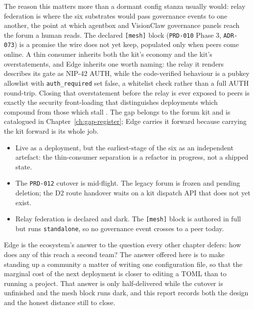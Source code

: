 The reason this matters more than a dormant config stanza usually would: relay federation is where the six substrates would pass governance events to one another, the point at which agentbox and VisionClaw governance panels reach the forum a human reads. The declared \texttt{[mesh]} block (\texttt{PRD-010} Phase 3, \texttt{ADR-073}) is a promise the wire does not yet keep, populated only when peers come online. A thin consumer inherits both the kit's economy and the kit's overstatements, and Edge inherits one worth naming: the relay it renders describes its gate as NIP-42 AUTH, while the code-verified behaviour is a pubkey allowlist with \texttt{auth\_required} set false, a whitelist check rather than a full AUTH round-trip. Closing that overstatement before the relay is ever exposed to peers is exactly the security front-loading that distinguishes deployments which compound from those which stall \parencite{Pereira2026Playbook}. The gap belongs to the forum kit and is catalogued in Chapter~\ref{ch:gap-register}; Edge carries it forward because carrying the kit forward is its whole job.

\begin{cautionbox}[title={What Edge Is Not Yet}]
\begin{itemize}
  \item Live as a deployment, but the earliest-stage of the six as an independent artefact: the thin-consumer separation is a refactor in progress, not a shipped state.
  \item The \texttt{PRD-012} cutover is mid-flight. The legacy forum is frozen and pending deletion; the D2 route handover waits on a kit dispatch API that does not yet exist.
  \item Relay federation is declared and dark. The \texttt{[mesh]} block is authored in full but runs \texttt{standalone}, so no governance event crosses to a peer today.
\end{itemize}
\end{cautionbox}

Edge is the ecosystem's answer to the question every other chapter defers: how does any of this reach a second team? The answer offered here is to make standing up a community a matter of writing one configuration file, so that the marginal cost of the next deployment is closer to editing a TOML than to running a project. That answer is only half-delivered while the cutover is unfinished and the mesh block runs dark, and this report records both the design and the honest distance still to close.
